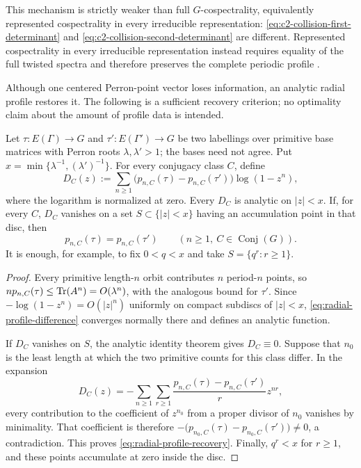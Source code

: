 This mechanism is strictly weaker than full \(G\)-cospectrality, equivalently
represented cospectrality in every irreducible representation:
\eqref{eq:c2-collision-first-determinant} and
\eqref{eq:c2-collision-second-determinant} are different.  Represented
cospectrality in every irreducible representation instead requires equality
of the full twisted spectra and therefore preserves the complete periodic profile
\cite{BoyleSchmieding2017FiniteGroupExtensions,
CavaleriDonno2022Cospectrality}.

Although one centered Perron-point vector loses information, an analytic radial profile
restores it.  The following is a sufficient recovery criterion; no optimality
claim about the amount of profile data is intended.

\begin{theorem}
\label{thm:radial-profile-recovery}
Let \(\tau:E(\Gamma)\to G\) and \(\tau':E(\Gamma')\to G\) be two
labellings over primitive base matrices with Perron roots
\(\lambda,\lambda'>1\); the bases need not agree.  Put
\(x=\min\{\lambda^{-1},(\lambda')^{-1}\}\).  For every conjugacy class \(C\),
define
\begin{equation}\label{eq:radial-profile-difference}
 D_C(z):=\sum_{n\ge1}
 \bigl(p_{n,C}(\tau)-p_{n,C}(\tau')\bigr)\log(1-z^n),
\end{equation}
where the logarithm is normalized at zero.  Every \(D_C\) is analytic on
\(|z|<x\).  If, for every \(C\), \(D_C\) vanishes on a set
\(S\subset\{|z|<x\}\) having an accumulation point in that disc,
then
\begin{equation}\label{eq:radial-profile-recovery}
 p_{n,C}(\tau)=p_{n,C}(\tau')
 \qquad(n\ge1,\ C\in\operatorname{Conj}(G)).
\end{equation}
It is enough, for example, to fix \(0<q<x\) and take
\(S=\{q^r:r\ge1\}\).
\end{theorem}

\begin{proof}
Every primitive length-\(n\) orbit contributes \(n\) period-\(n\) points, so
\(np_{n,C}(\tau)\le\operatorname{Tr}(A^n)=O(\lambda^n)\), with the analogous bound
for \(\tau'\).  Since
\(-\log(1-z^n)=O(|z|^n)\) uniformly on compact subdiscs of
\(|z|<x\), \eqref{eq:radial-profile-difference} converges normally
there and defines an analytic function.

If \(D_C\) vanishes on \(S\), the analytic identity theorem gives
\(D_C\equiv0\).  Suppose that \(n_0\) is the least length at which the two
primitive counts for this class differ.  In the expansion
\[
 D_C(z)=-\sum_{n\ge1}\sum_{r\ge1}
  \frac{p_{n,C}(\tau)-p_{n,C}(\tau')}{r}z^{nr},
\]
every contribution to the coefficient of \(z^{n_0}\) from a proper divisor
of \(n_0\) vanishes by minimality.  That coefficient is therefore
\(-\bigl(p_{n_0,C}(\tau)-p_{n_0,C}(\tau')\bigr)\ne0\), a contradiction.
This proves \eqref{eq:radial-profile-recovery}.  Finally,
\(q^r<x\) for \(r\ge1\), and these points accumulate at zero inside the
disc.
\end{proof}

